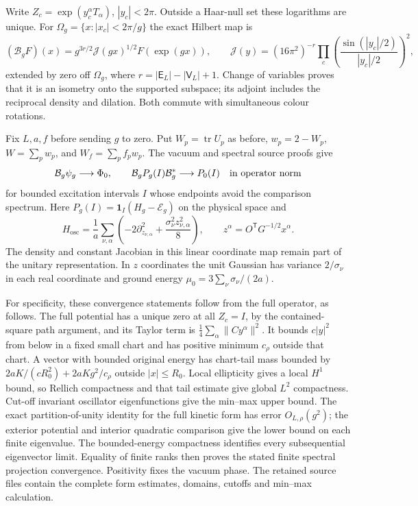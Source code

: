 Write $Z_c=\exp(y_c^\alpha T_\alpha)$, $|y_c|<2\pi$.
Outside a Haar-null set these logarithms are unique. For
$\Omega_g=\{x:|x_c|<2\pi/g\}$ the exact Hilbert map is
\begin{equation}\label{eq:low-chart}
 (\mathcal B_gF)(x)=
 g^{3r/2}\mathcal J(gx)^{1/2}F(\exp(gx)),\qquad
 \mathcal J(y)=(16\pi^2)^{-r}
 \prod_c\left(\frac{\sin(|y_c|/2)}{|y_c|/2}\right)^2,
\end{equation}
extended by zero off $\Omega_g$, where $r=|\mathsf E_L|-|\mathsf V_L|+1$.
Change of variables proves that it is an isometry onto the supported
subspace; its adjoint includes the reciprocal density and dilation.
Both commute with simultaneous colour rotations.

Fix $L,a,f$ before sending $g$ to zero. Put $W_p= \operatorname{tr}U_p$
as before, $w_p=2-W_p$, $W=\sum_pw_p$, and $W_f=\sum_pf_pw_p$.
The vacuum and spectral source proofs give
\[
 \mathcal B_g\psi_g\longrightarrow\Phi_0,\qquad
 \mathcal B_gP_g(I)\mathcal B_g^*\longrightarrow P_0(I)
 \quad\hbox{in operator norm}
\]
for bounded excitation intervals $I$ whose endpoints avoid the comparison
spectrum. Here $P_g(I)=\mathbf1_I(H_g-\mathcal E_g)$ on the physical
space and
\[
 H_{\mathrm{osc}}=\frac1a\sum_{\nu,\alpha}
 \left(-2\partial_{z_{\nu,\alpha}}^2+
             \frac{\sigma_\nu^2z_{\nu,\alpha}^2}{8}\right),
 \qquad z^\alpha=O^{\mathsf T}G^{-1/2}x^\alpha .
\]
The density and constant Jacobian in this linear coordinate map remain
part of the unitary representation. In $z$ coordinates the unit
Gaussian has variance $2/\sigma_\nu$ in each real coordinate and
ground energy $\mu_0=3\sum_\nu\sigma_\nu/(2a)$.

For specificity, these convergence statements follow from the full
operator, as follows. The full potential has a unique zero at all
$Z_c=I$, by the contained-square path argument, and its Taylor term is
$\frac14\sum_\alpha\|Cy^\alpha\|^2$. It bounds $c|y|^2$ from below in a
fixed small chart and has positive minimum $c_\rho$ outside that chart.
A vector with bounded original energy has chart-tail mass bounded by
$2aK/(cR_0^2)+2aKg^2/c_\rho$ outside $|x|\le R_0$.
Local ellipticity gives a local $H^1$ bound, so Rellich compactness
and that tail estimate give global $L^2$ compactness.
Cut-off invariant oscillator eigenfunctions give the min--max upper
bound. The exact partition-of-unity identity for the full kinetic
form has error $O_{L,\rho}(g^2)$; the exterior potential and interior
quadratic comparison give the lower bound on each finite eigenvalue.
The bounded-energy compactness identifies every subsequential
eigenvector limit. Equality of finite ranks then proves the stated
finite spectral projection convergence. Positivity fixes the vacuum
phase. The retained source files contain the complete form estimates,
domains, cutoffs and min--max calculation.


